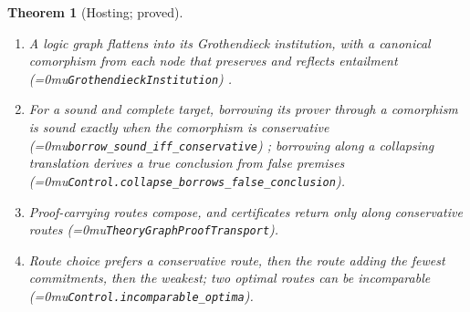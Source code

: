 \documentclass[11pt]{article}
\newcommand{\leanname}[1]{\textup{\Urlmuskip=0mu\relax\nolinkurl{#1}}}
\newtheorem{theorem}{Theorem}
\theoremstyle{definition}
\theoremstyle{remark}
\begin{document}
\begin{theorem}[Hosting; proved]
\leavevmode
\begin{enumerate}[leftmargin=*]
\item A logic graph flattens into its Grothendieck institution, with a
  canonical comorphism from each node that preserves and reflects entailment
  (\leanname{GrothendieckInstitution}) \cite{DiaconescuGrothendieckInstitutions}.
\item For a sound and complete target, borrowing its prover through a
  comorphism is sound exactly when the comorphism is conservative
  (\leanname{borrow_sound_iff_conservative}) \cite{CerioliMeseguerBorrow};
  borrowing along a collapsing translation derives a true conclusion from
  false premises (\leanname{Control.collapse_borrows_false_conclusion}).
\item Proof-carrying routes compose, and certificates return only along
  conservative routes (\leanname{TheoryGraphProofTransport}).
\item Route choice prefers a conservative route, then the route adding the
  fewest commitments, then the weakest; two optimal routes can be
  incomparable (\leanname{Control.incomparable_optima}).
\end{enumerate}
\end{theorem}
\end{document}
